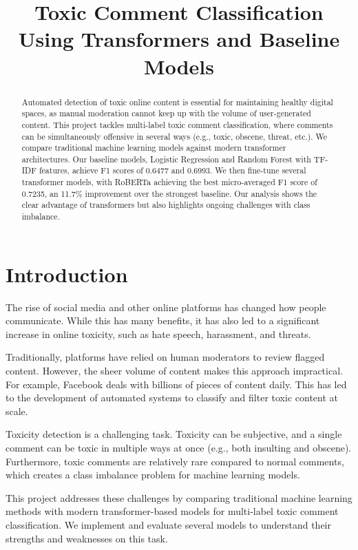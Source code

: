 \documentclass[11pt]{article}
\title{Toxic Comment Classification Using Transformers and Baseline Models}
\author{}
\begin{document}
\maketitle

\begin{abstract}
Automated detection of toxic online content is essential for maintaining healthy digital spaces, as manual moderation cannot keep up with the volume of user-generated content. This project tackles multi-label toxic comment classification, where comments can be simultaneously offensive in several ways (e.g., toxic, obscene, threat, etc.). We compare traditional machine learning models against modern transformer architectures. Our baseline models, Logistic Regression and Random Forest with TF-IDF features, achieve F1 scores of 0.6477 and 0.6993. We then fine-tune several transformer models, with RoBERTa achieving the best micro-averaged F1 score of 0.7235, an 11.7\% improvement over the strongest baseline. Our analysis shows the clear advantage of transformers but also highlights ongoing challenges with class imbalance.
\end{abstract}

\section{Introduction}

The rise of social media and other online platforms has changed how people communicate. While this has many benefits, it has also led to a significant increase in online toxicity, such as hate speech, harassment, and threats.

Traditionally, platforms have relied on human moderators to review flagged content. However, the sheer volume of content makes this approach impractical. For example, Facebook deals with billions of pieces of content daily. This has led to the development of automated systems to classify and filter toxic content at scale.

Toxicity detection is a challenging task. Toxicity can be subjective, and a single comment can be toxic in multiple ways at once (e.g., both insulting and obscene). Furthermore, toxic comments are relatively rare compared to normal comments, which creates a class imbalance problem for machine learning models.

This project addresses these challenges by comparing traditional machine learning methods with modern transformer-based models for multi-label toxic comment classification. We implement and evaluate several models to understand their strengths and weaknesses on this task.
\end{document}

